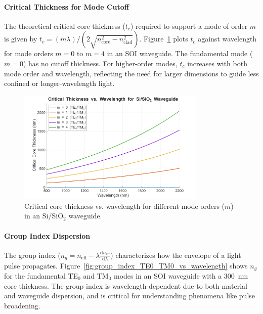 \documentclass[10pt, a4paper]{article}
\begin{document}
\paragraph{Critical Thickness for Mode Cutoff}
The theoretical critical core thickness ($t_c$) required to support a mode of order $m$ is given by $t_c = (m \lambda) / (2 \sqrt{n_{\text{core}}^2 - n_{\text{clad}}^2})$. Figure~\ref{fig:critical_thickness_vs_wavelength} plots $t_c$ against wavelength for mode orders $m=0$ to $m=4$ in an SOI waveguide. The fundamental mode ($m=0$) has no cutoff thickness. For higher-order modes, $t_c$ increases with both mode order and wavelength, reflecting the need for larger dimensions to guide less confined or longer-wavelength light.

\begin{figure}[h!]
    \centering
    \includegraphics[width=0.8\textwidth]{task1/critical_thickness_vs_wavelength.png}
    \caption{Critical core thickness vs. wavelength for different mode orders ($m$) in an Si/SiO$_2$ waveguide.}
    \label{fig:critical_thickness_vs_wavelength}
\end{figure}

\paragraph{Group Index Dispersion}
The group index ($n_g = n_{\text{eff}} - \lambda \frac{\mathrm{d}n_{\text{eff}}}{\mathrm{d}\lambda}$) characterizes how the envelope of a light pulse propagates. Figure~\ref{fig:group_index_TE0_TM0_vs_wavelength} shows $n_g$ for the fundamental TE$_0$ and TM$_0$ modes in an SOI waveguide with a 300~nm core thickness. The group index is wavelength-dependent due to both material and waveguide dispersion, and is critical for understanding phenomena like pulse broadening.
\end{document}
